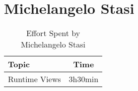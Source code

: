 \section*{Michelangelo Stasi}
\begin{table}[H]
    \renewcommand{\arraystretch}{1.5}
    \centering
    \begin{tabular}{|l|c|}
        \hline
        \textbf{Topic} & \textbf{Time} \\ \hline
        Runtime Views  & 3h30min       \\ \hline
    \end{tabular}
    \caption{Effort Spent by Michelangelo Stasi}
    \label{tab:stasi-effort-spent}
\end{table}
